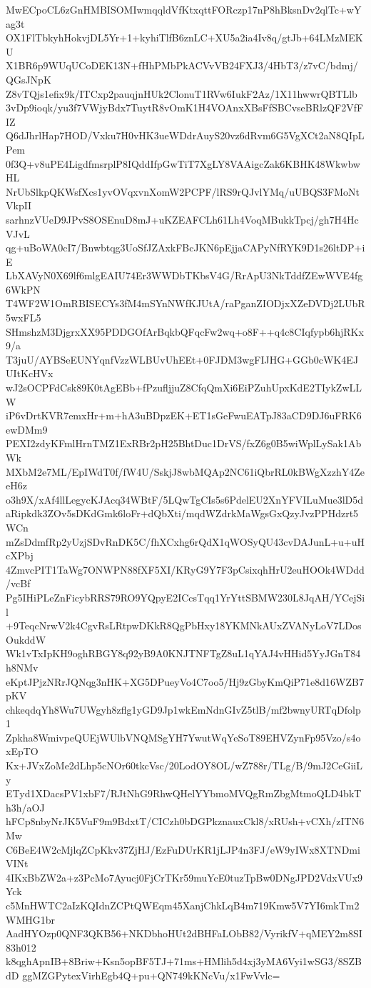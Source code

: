 MwECpoCL6zGnHMBISOMIwmqqldVfKtxqttFORczp17nP8hBksnDv2qlTc+wYag3t
OX1FlTbkyhHokvjDL5Yr+1+kyhiTlfB6znLC+XU5a2ia4Iv8q/gtJb+64LMzMEKU
X1BR6p9WUqUCoDEK13N+fHhPMbPkACVvVB24FXJ3/4HbT3/z7vC/bdmj/QGsJNpK
Z8vTQjs1efix9k/ITCxp2pauqjnHUk2ClonuT1RVw6IukF2Az/1X11hwwrQBTLlb
3vDp9ioqk/yu3f7VWjyBdx7TuytR8vOmK1H4VOAnxXBsFfSBCvseBRlzQF2VfFIZ
Q6dJhrlHap7HOD/Vxku7H0vHK3ueWDdrAuyS20vz6dRvm6G5VgXCt2aN8QIpLPem
0f3Q+v8uPE4LigdfmsrplP8IQddIfpGwTiT7XgLY8VAAigcZak6KBHK48WkwbwHL
NrUbSlkpQKWsfXcs1yvOVqxvnXomW2PCPF/lRS9rQJvlYMq/uUBQS3FMoNtVkpII
sarhnzVUeD9JPvS8OSEnuD8mJ+uKZEAFCLh61Lh4VoqMBukkTpcj/gh7H4HcVJvL
qg+uBoWA0cI7/Bnwbtqg3UoSfJZAxkFBcJKN6pEjjaCAPyNfRYK9D1s26ltDP+iE
LbXAVyN0X69lf6mlgEAIU74Er3WWDbTKbsV4G/RrApU3NkTddfZEwWVE4fg6WkPN
T4WF2W1OmRBISECYs3fM4mSYnNWfKJUtA/raPganZIODjxXZeDVDj2LUbR5wxFL5
SHmshzM3DjgrxXX95PDDGOfArBqkbQFqcFw2wq+o8F++q4c8CIqfypb6hjRKx9/a
T3juU/AYBSeEUNYqnfVzzWLBUvUhEEt+0FJDM3wgFIJHG+GGb0cWK4EJUItKcHVx
wJ2sOCPFdCsk89K0tAgEBb+fPzufljjuZ8CfqQmXi6EiPZuhUpxKdE2TIykZwLLW
iP6vDrtKVR7emxHr+m+hA3uBDpzEK+ET1sGeFwuEATpJ83aCD9DJ6uFRK6ewDMm9
PEXI2zdyKFmlHrnTMZ1ExRBr2pH25BhtDuc1DrVS/fxZ6g0B5wiWplLySak1AbWk
MXbM2e7ML/EpIWdT0f/fW4U/SskjJ8wbMQAp2NC61iQbrRL0kBWgXzzhY4ZeeH6z
o3h9X/xAf4llLegycKJAcq34WBtF/5LQwTgCIs5s6PdelEU2XnYFVILuMue3lD5d
aRipkdk3ZOv5sDKdGmk6loFr+dQbXti/mqdWZdrkMaWgsGxQzyJvzPPHdzrt5WCn
mZsDdmfRp2yUzjSDvRnDK5C/fhXCxhg6rQdX1qWOSyQU43cvDAJunL+u+uHcXPbj
4ZmvcPIT1TaWg7ONWPN88fXF5XI/KRyG9Y7F3pCsixqhHrU2euHOOk4WDdd/vcBf
Pg5IHiPLeZnFicybRRS79RO9YQpyE2ICcsTqq1YrYttSBMW230L8JqAH/YCejSil
+9TeqcNrwV2k4CgvRsLRtpwDKkR8QgPbHxy18YKMNkAUxZVANyLoV7LDosOukddW
Wk1vTxIpKH9oghRBGY8q92yB9A0KNJTNFTgZ8uL1qYAJ4vHHid5YyJGnT84h8NMv
eKptJPjzNRrJQNqg3nHK+XG5DPueyVo4C7oo5/Hj9zGbyKmQiP71e8d16WZB7pKV
chkeqdqYh8Wu7UWgyh8zflg1yGD9Jp1wkEmNdnGIvZ5tlB/mf2bwnyURTqDfolp1
Zpkha8WmivpeQUEjWUlbVNQMSgYH7YwutWqYeSoT89EHVZynFp95Vzo/s4oxEpTO
Kx+JVxZoMe2dLhp5cNOr60tkcVsc/20LodOY8OL/wZ788r/TLg/B/9mJ2CeGiiLy
ETyd1XDacsPV1xbF7/RJtNhG9RhwQHelYYbmoMVQgRmZbgMtmoQLD4bkTh3h/aOJ
hFCp8nbyNrJK5VuF9m9BdxtT/CICzh0bDGPkznauxCkl8/xRUsh+vCXh/zITN6Mw
C6BeE4W2cMjlqZCpKkv37ZjHJ/EzFuDUrKR1jLJP4n3FJ/eW9yIWx8XTNDmiVINt
4IKxBbZW2a+z3PcMo7Ayucj0FjCrTKr59muYcE0tuzTpBw0DNgJPD2VdxVUx9Yck
c5MnHWTC2aIzKQIdnZCPtQWEqm45XanjChkLqB4m719Kmw5V7YI6mkTm2WMHG1br
AadHYOzp0QNF3QKB56+NKDbhoHUt2dBHFaLObB82/VyrikfV+qMEY2m8SI83h012
k8qghApnIB+8Briw+Ksn5opBF5TJ+71ms+HMlih5d4xj3yMA6Vyi1wSG3/8SZBdD
ggMZGPytexVirhEgb4Q+pu+QN749kKNcVu/x1FwVvlc=
